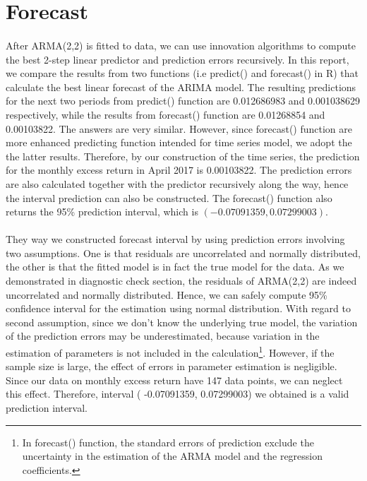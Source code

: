 \documentclass[10pt,letter]{article}
\begin{document}
\section*{Forecast}
\paragraph{} After ARMA(2,2) is fitted to data, we can use innovation algorithms to compute the best 2-step linear predictor and prediction errors recursively. In this report, we compare the results from two functions (i.e predict() and forecast() in R) that calculate the best linear forecast of the ARIMA model. The resulting predictions for the next two periods from predict() function are 0.012686983 and 0.001038629 respectively, while the results from forecast() function are 0.01268854 and 0.00103822. The answers are very similar. However, since forecast() function are more enhanced predicting function intended for time series model, we adopt the the latter results. Therefore, by our construction of the time series, the prediction for the monthly excess return in April 2017 is 0.00103822.  The prediction errors are also calculated together with the predictor recursively along the way, hence the interval prediction can also be constructed. The forecast() function also returns the 95\% prediction interval, which is $(-0.07091359, 0.07299003)$.

\paragraph{} They way we constructed forecast interval by using prediction errors involving two assumptions. One is that residuals are uncorrelated and normally distributed, the other is that the fitted model is in fact the true model for the data. As we demonstrated in diagnostic check section, the residuals of ARMA(2,2) are indeed uncorrelated and normally distributed. Hence, we can safely compute 95\% confidence interval for the estimation using normal distribution. With regard to second assumption, since we don't know the underlying true model, the variation of the prediction errors may be underestimated, because variation in the estimation of parameters is not included in the calculation\footnote[8]{In forecast() function, the standard errors of prediction exclude the uncertainty in the estimation of the ARMA model and the regression coefficients.}. However, if the sample size is large, the effect of errors in parameter estimation is negligible. Since our data on monthly excess return have 147 data points, we can neglect this effect. Therefore, interval ( -0.07091359, 0.07299003) we obtained is a valid prediction interval.
\end{document}
